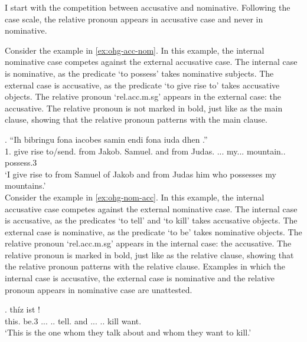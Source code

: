 I start with the competition between accusative and nominative. Following the case scale, the relative pronoun appears in accusative case and never in nominative.

Consider the example in \ref{ex:ohg-acc-nom}. In this example, the internal nominative case competes against the external accusative case.
The internal case is nominative, as the predicate  `to possess' takes nominative subjects.
The external case is accusative, as the predicate  `to give rise to' takes accusative objects.
The relative pronoun  `\ac{rel}.\ac{acc}.\ac{m}.\ac{sg}' appears in the external case: the accusative. The relative pronoun is not marked in bold, just like as the main clause, showing that the relative pronoun patterns with the main clause.


\exg. ``Ih bibringu fona iacobes samin endi fona iuda dhen   .''\\
1. {give rise to/send}.\scsub{[acc]} from Jakob. Samuel. and from Judas. ... my... mountain.. possess.3\scsub{[nom]}\\
`I give rise to from Samuel of Jakob and from Judas him who possesses my mountains.' \label{ex:ohg-acc-nom}\\

Consider the example in \ref{ex:ohg-nom-acc}. In this example, the internal accusative case competes against the external nominative case.
The internal case is accusative, as the predicates  `to tell' and  `to kill' takes accusative objects.
The external case is nominative, as the predicate  `to be' takes nominative objects.
The relative pronoun  `\ac{rel}.\ac{acc}.\ac{m}.\ac{sg}' appears in the internal case: the accusative. The relative pronoun is marked in bold, just like as the relative clause, showing that the relative pronoun patterns with the relative clause.
Examples in which the internal case is accusative, the external case is nominative and the relative pronoun appears in nominative case are unattested.

\exg. thíz ist        !\\
this. be.3\scsub{[nom]} ... .. tell.\scsub{[acc]}
and ... .. kill\scsub{[acc]} want.\\
`This is the one whom they talk about and whom they want to kill.' \label{ex:ohg-nom-acc}

